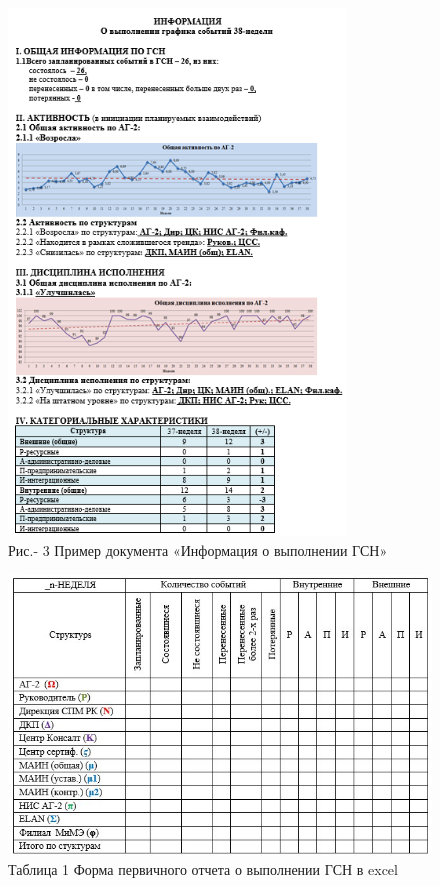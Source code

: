 \begin{figure}[H]
	\centering
	\includegraphics[width=0.8\textwidth]{media/ekon/image3}
	\caption*{Рис.- 3 Пример документа «Информация о выполнении ГСН»}
\end{figure}




\begin{figure}[H]
  \caption*{Таблица 1 Форма первичного отчета о выполнении ГСН в excel}
	\centering
	\includegraphics[width=\textwidth]{media/ekon/image3.2}
\end{figure}

